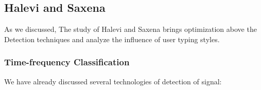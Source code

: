 \documentclass[12pt,a4paper]{article}
\begin{document}
\subsection{Halevi and Saxena}

As we discussed, The study of Halevi and Saxena brings optimization above the Detection techniques and analyze the influence of user typing styles.\\

\subsubsection{Time-frequency Classification}
\newcommand{\tabincell}[2]{\begin{tabular}{@{}#1@{}}#2\end{tabular}}  

We have already discussed several technologies of detection of signal: \\
\end{document}
